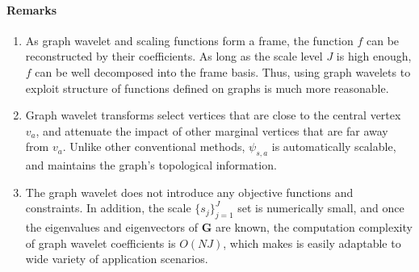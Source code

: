\vspace{-1.5mm}
\paragraph{\textbf{Remarks}}
\vspace{-5mm}
\begin{enumerate}
\item As graph wavelet and scaling functions form a frame, the function $f$ can be reconstructed by their coefficients.
As long as the scale level $J$ is high enough, $f$ can be well decomposed into the frame basis. Thus, using graph wavelets to exploit structure of functions defined on graphs is much more reasonable.
\vspace{-1mm}
\item Graph wavelet transforms select vertices that are close to the central vertex $v_a$, and attenuate the impact of other marginal vertices that are far away from $v_a$.
Unlike other conventional methods,  $\psi_{s,a}$ is automatically scalable, and maintains the graph's topological information.
\vspace{-1mm}
\item The graph wavelet does not introduce any objective functions and constraints. In addition, the scale $\{s_j\}_{j=1}^J$ set is numerically small, and once the eigenvalues and eigenvectors of $\mathbf{G}$ are known, the computation complexity of graph wavelet coefficients is $O(NJ)$, which makes is easily adaptable to wide variety of application scenarios.
\end{enumerate}

